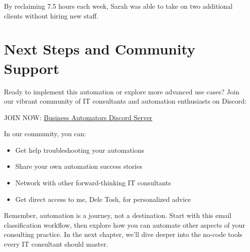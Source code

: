 By reclaiming 7.5 hours each week, Sarah was able to take on two additional clients without hiring new staff.


\section{Next Steps and Community Support}

Ready to implement this automation or explore more advanced use cases? Join our vibrant community of IT consultants and automation enthusiasts on Discord:

JOIN NOW: \href{https://discord.gg/P6txNctp}{Business Automators Discord Server}

In our community, you can:
\begin{itemize}
    \item Get help troubleshooting your automations
    \item Share your own automation success stories
    \item Network with other forward-thinking IT consultants
    \item Get direct access to me, Dele Tosh, for personalized advice
\end{itemize}

Remember, automation is a journey, not a destination. Start with this email classification workflow, then explore how you can automate other aspects of your consulting practice. In the next chapter, we'll dive deeper into the no-code tools every IT consultant should master.